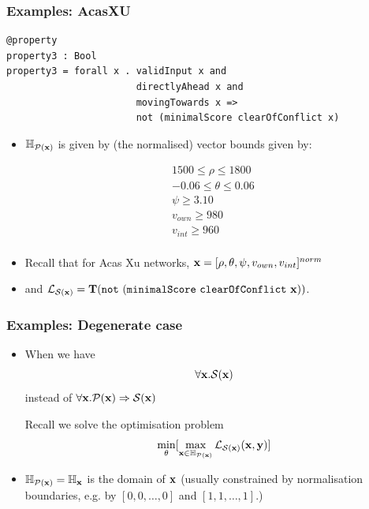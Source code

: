 \documentclass[t,compress,aspectratio=169]{beamer}
\newcommand{\translation}{\mathbf{T}}
\newcommand{\xs}{\x} 			%
\begin{document}
\begin{frame}[fragile]
\frametitle{Examples: AcasXU}
 \vspace{-4em}

\begin{block}{}
\begin{verbatim}
@property
property3 : Bool
property3 = forall x . validInput x and
                       directlyAhead x and
                       movingTowards x =>
                       not (minimalScore clearOfConflict x)
\end{verbatim}
\end{block}

\begin{itemize}
\item $\mathbb{H}_{\mathcal{P}(\xs)}$ is given by (the normalised) vector bounds given by:

\begin{equation*}
\begin{array}{l}
1500 \leq \rho \leq 1800 \  \\
-0.06 \leq \theta \leq 0.06 \  \\
\psi \geq 3.10 \  \\
  v_{own} \geq 980 \ \\
v_{int} \geq 960 \  \\

\end{array}
\end{equation*}

\item Recall that for Acas Xu networks, $\mathbf{x} = [\rho, \theta, \psi, v_{own}, v_{int}]^{norm}$

\pause

\item  and $\lossfn_{\mathcal{S}(\xs)} = \translation (\mathtt{not\ (minimalScore\ clearOfConflict}\ \xs))$.


\end{itemize}
\end{frame}



\begin{frame}[fragile]
\frametitle{Examples: Degenerate case}
\begin{itemize}
\item When we have $$\forall \xs. \mathcal{S}(\xs)$$
instead of
$\forall \xs. \mathcal{P}(\xs) \Rightarrow \mathcal{S}(\xs)$
\begin{block}{Recall we solve the optimisation problem}
$$\min_{\theta} [ \max_{\xs \in \mathbb{H}_{\mathcal{P}(\xs)}} \lossfn_{\mathcal{S}(\xs)}(\xs, \y)]$$
\end{block}


\item $\mathbb{H}_{\mathcal{P}(\xs)} = \mathbb{H}_{\xs}$ is the domain of $\xs$ (usually constrained by normalisation boundaries, e.g. by $[0, 0 , \ldots , 0]$ and $[1, 1 , \ldots , 1]$.)



\end{itemize}

\end{frame}
\end{document}
